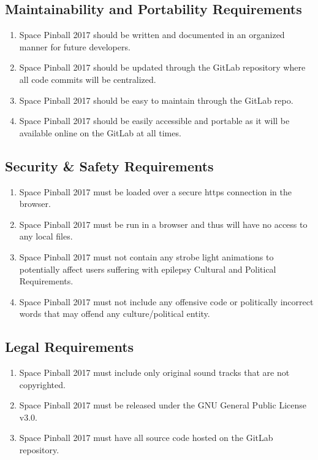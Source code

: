 \documentclass[12pt]{article}
\begin{document}
	\subsection{Maintainability and Portability Requirements}
		\begin{enumerate}

\item Space Pinball 2017 should be written and documented in an organized manner for future developers.
\item Space Pinball 2017 should be updated through the GitLab repository where all code commits will be centralized.
\item Space Pinball 2017 should be easy to maintain through the GitLab repo.
\item Space Pinball 2017 should be easily accessible and portable as it will be available online on the GitLab at all times.
		\end{enumerate}
	\subsection{Security \& Safety Requirements}
		\begin{enumerate}

\item Space Pinball 2017 must be loaded over a secure https connection in the browser.
\item Space Pinball 2017 must be run in a browser and thus will have no access to any local files.
\item Space Pinball 2017 must not contain any strobe light animations to potentially affect users suffering with epilepsy 
Cultural and Political Requirements.
\item Space Pinball 2017 must not include any offensive code or politically incorrect words that may offend any culture/political entity.
		\end{enumerate}
	\subsection{Legal Requirements}
		\begin{enumerate}

\item Space Pinball 2017 must include only original sound tracks that are not copyrighted.
\item Space Pinball 2017 must be released under the GNU General Public License v3.0.
\item Space Pinball 2017 must have all source code hosted on the GitLab repository.
	\end{enumerate}
\end{document}
